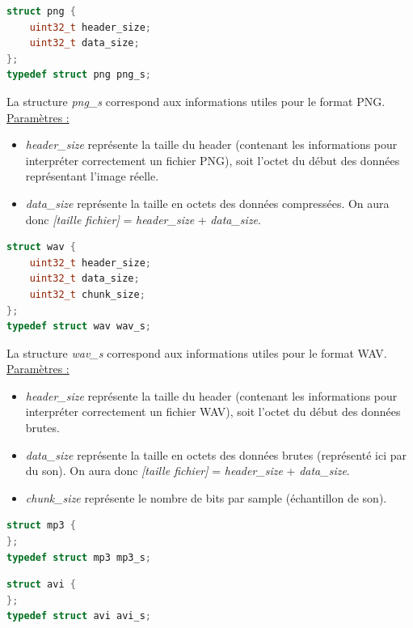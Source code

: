 \documentclass[11pt]{article}
\begin{document}
\begin{lstlisting}[language=c]
struct png {
	uint32_t header_size;
	uint32_t data_size;
};
typedef struct png png_s;
\end{lstlisting}

La structure \textit{png\_s} correspond aux informations 
utiles pour le format PNG.  
\newline
\underline{Paramètres :}
\begin{itemize}
\item \textit{header\_size} représente la taille du header (contenant les 
informations pour interpréter correctement un fichier PNG), soit l'octet 
du début des données représentant l'image réelle. 
\item \textit{data\_size} représente la taille en octets des données compressées. 
On aura donc 
\textit{[taille fichier]} = \textit{header\_size} + \textit{data\_size}.
\newline
\end{itemize}

\begin{lstlisting}[language=c]
struct wav {
	uint32_t header_size;
	uint32_t data_size;
	uint32_t chunk_size;
};
typedef struct wav wav_s;
\end{lstlisting}

La structure \textit{wav\_s} correspond aux informations 
utiles pour le format WAV.  
\newline
\underline{Paramètres :}
\begin{itemize}
\item \textit{header\_size} représente la taille du header (contenant les 
informations pour interpréter correctement un fichier WAV), soit l'octet 
du début des données brutes. 
\item \textit{data\_size} représente la taille en octets des données brutes 
(représenté ici par du son). On aura donc 
\textit{[taille fichier]} = \textit{header\_size} + \textit{data\_size}.
\item \textit{chunk\_size} représente le nombre de bits par sample (échantillon 
de son). 
\newline
\end{itemize}

\begin{lstlisting}[language=c]
struct mp3 {
};
typedef struct mp3 mp3_s;
\end{lstlisting}

\begin{lstlisting}[language=c]
struct avi {
};
typedef struct avi avi_s;
\end{lstlisting}
\end{document}
